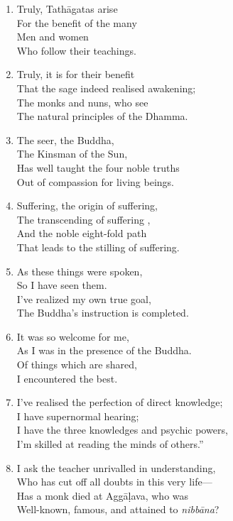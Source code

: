 \documentclass[10pt, openany]{book}
\newcommand*{\vleftofline}[1]{\leavevmode\llap{#1}}
\begin{document}
\begin{enumerate}
\item Truly, Tathāgatas arise\\
For the benefit of the many\\
Men and women\\
Who follow their teachings.

\item Truly, it is for their benefit\\
That the sage indeed realised awakening;\\
The monks and nuns, who see\\
The natural principles of the Dhamma.

\item The seer, the Buddha,\\
The Kinsman of the Sun,\\
Has well taught the four noble truths\\
Out of compassion for living beings.

\item Suffering, the origin of suffering,\\
The transcending of suffering ,\\
And the noble eight-fold path\\
That leads to the stilling of suffering.

\item As these things were spoken,\\
So I have seen them.\\
I’ve realized my own true goal,\\
The Buddha’s instruction is completed.

\item It was so welcome for me,\\
As I was in the presence of the Buddha.\\
Of things which are shared,\\
I encountered the best.

\item I’ve realised the perfection of direct knowledge;\\
I have supernormal hearing;\\
I have the three knowledges and psychic powers,\\
I’m skilled at reading the minds of others.”

\item \vleftofline{“}I ask the teacher unrivalled in understanding,\\
Who has cut off all doubts in this very life—\\
Has a monk died at Aggāḷava, who was\\
Well-known, famous, and attained to \emph{nibbāna}?


\end{enumerate}
\end{document}

